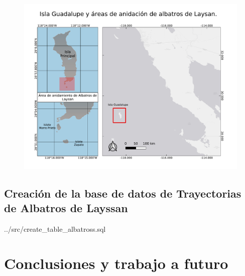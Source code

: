 \documentclass[a4paper, 11pt]{article}
\begin{document}
\begin{figure}[h!]
    \includegraphics[scale=0.60]{figures/Isla Guadalupe.pdf}
    \centering
\end{figure}

\subsection{Creación de la base de datos de Trayectorias de Albatros de Layssan}

 {../src/create_table_albatross.sql}

\section{Conclusiones y trabajo a futuro}


\pagebreak
 

\end{document}
